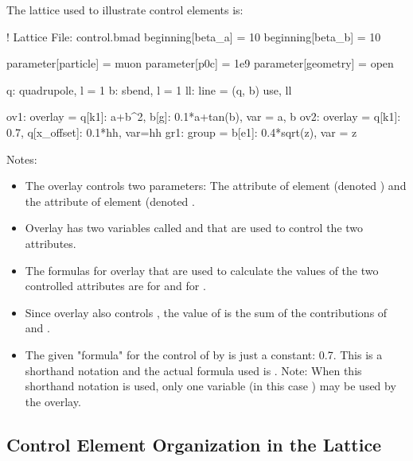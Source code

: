 \documentclass{hitec}
\begin{document}
The lattice used to illustrate control elements is:
\begin{code}
! Lattice File: control.bmad
beginning[beta_a] = 10
beginning[beta_b] = 10

parameter[particle] = muon
parameter[p0c] = 1e9
parameter[geometry] = open

q: quadrupole, l = 1
b: sbend, l = 1
ll: line = (q, b)
use, ll

ov1: overlay = {q[k1]: a+b^2, b[g]: 0.1*a+tan(b)}, var = {a, b}
ov2: overlay = {q[k1]: 0.7, q[x_offset]: 0.1*hh}, var={hh}
gr1: group = {b[e1]: 0.4*sqrt(z)}, var = {z}
\end{code}

Notes:
\vspace{-10 pt}
\begin{itemize}
\item
The overlay  controls two parameters: 
The  attribute of element  (denoted ) and the  attribute of element
 (denoted .
\item
Overlay  has two variables called  and  that are used to control the two attributes.
\item
The formulas for overlay  that are used to calculate the values of the two controlled
attributes are  for  and  for .
\item 
Since overlay  also controls , the value of  is the sum of the
contributions of  and .
\item
The given "formula" for the control of  by  is just a constant: 0.7. 
This is a shorthand notation and the actual formula used is . 
Note: When this shorthand notation is used, only one variable (in this case ) may be used by the overlay.
\end{itemize}

\newpage

\subsection{Control Element Organization in the Lattice}
\end{document}
